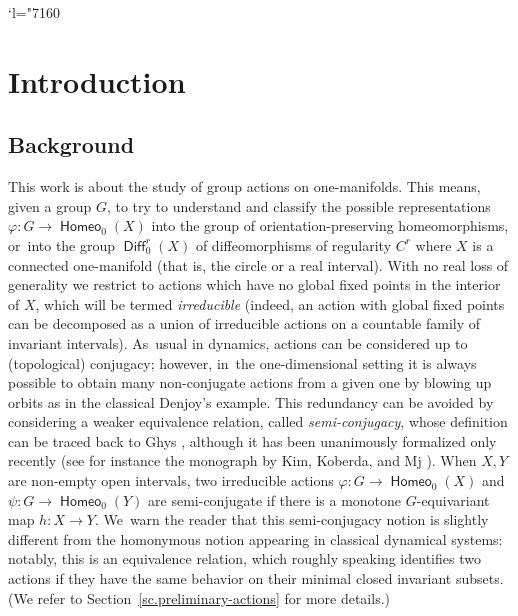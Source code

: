 \documentclass[JEP,XML,SOM,Unicode,NoFloatCountersInSection,published]{cedram}
\newcommand{\Changel}{\mathcode`l="7160}
\theoremstyle{definition}
\DeclareMathOperator{\Diff}{\mathsf{Diff}}
\DeclareMathOperator{\homeo}{\mathsf{Homeo}}
\begin{document}
\maketitle

\tableofcontents
\mainmatter

\vspace*{-\baselineskip}\vskip0pt
\Changel

\section{Introduction}
\subsection{Background}
This work is about the study of group actions on one-manifolds. This means, given a group $G$, to try to understand and classify the possible representations $\varphi\colon G \to \homeo_0(X)$ into the group of orientation-preserving homeomorphisms, or~into the group $\Diff^r_0(X)$ of diffeomorphisms of regularity $C^r$ where $X$ is a connected one-manifold (that is, the circle or a real interval). With no real loss of generality we restrict to actions which have no global fixed points in the interior of $X$, which will be termed \emph{irreducible} (indeed, an action with global fixed points can be decomposed as a union of irreducible actions on a countable family of invariant intervals). As~usual in dynamics, actions can be considered up to (topological) conjugacy; however, in~the one-dimensional setting it is always possible to obtain many non-conjugate actions from a given one by blowing up orbits as in the classical Denjoy's example. This redundancy can be avoided by considering a weaker equivalence relation, called \emph{semi-conjugacy}, whose definition can be traced back to Ghys \cite{ghysbounded}, although it has been unanimously formalized only recently (see for instance the monograph by Kim, Koberda, and Mj \cite{KKMj}). When $X, Y$ are non-empty open intervals, two irreducible actions $\varphi\colon G\to \homeo_0(X)$ and $\psi \colon G \to \homeo_0(Y)$ are semi-conjugate if there is a monotone $G$-equivariant map $h\colon X\to Y$. We~warn the reader that this semi-conjugacy notion is slightly different from the homonymous notion appearing in classical dynamical systems: notably, this is an equivalence relation, which roughly speaking identifies two actions if they have the same behavior on their minimal closed invariant subsets. (We refer to Section~\ref{sc.preliminary-actions} for more details.)
\end{document}
